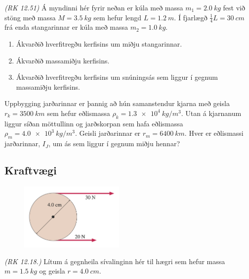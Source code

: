 \ifdefined \wholebook \else\documentclass[oneside]{book}\usepackage{EdlBook}\graphicspath{{figures/}}
\begin{document}
\begin{enumerate}[label = \textbf{Dæmi \thechapter.\arabic*.}]
\begin{minipage}{\linewidth}
\item \textit{(RK 12.51)} Á myndinni hér fyrir neðan er kúla með massa $m_1 = \SI{2.0}{kg}$ fest við stöng með massa $M = \SI{3.5}{kg}$ sem hefur lengd $L = \SI{1.2}{m}$. Í fjarlægð $\frac{1}{4}L = \SI{30}{cm}$ frá enda stangarinnar er kúla með massa $m_2 = \SI{1.0}{kg}$.

\begin{enumerate}[label = \textbf{(\alph*)}]
    \item Ákvarðið hverfitregðu kerfisins um miðju stangarinnar.
    \item Ákvarðið massamiðju kerfisins.
    \item Ákvarðið hverfitregðu kerfisins um snúningsás sem liggur í gegnum massamiðju kerfisins.
\end{enumerate}

\end{minipage}

\item Uppbygging jarðarinnar er þannig að hún samanstendur kjarna með geisla $r_k = \SI{3500}{km}$ sem hefur eðlismassa $\rho_k = \SI{1.3e4}{kg/m^3}$. Utan á kjarnanum liggur síðan möttullinn og jarðskorpan sem hafa eðlismassa $\rho_m = \SI{4.0e3}{kg/m^3}$. Geisli jarðarinnar er $r_m = \SI{6400}{km}$. Hver er eðlismassi jarðarinnar, $I_J$, um ás sem liggur í gegnum miðju hennar?





\subsection*{Kraftvægi}

\begin{minipage}{\linewidth}

\begin{figure}
\vspace{-0.755cm}
\includegraphics[width=2in]{images/torque1.png}
\end{figure}

\item \textit{(RK 12.18.)} Lítum á gegnheila sívalinginn hér til hægri sem hefur massa $m = \SI{1.5}{kg}$ og geisla $r = \SI{4.0}{cm}$.


\end{minipage}
\end{enumerate}
\end{document}
